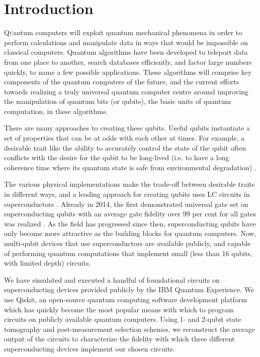 \section{Introduction}

\lettrine[nindent=0em,lines=3]{Q} uantum computers will exploit quantum mechanical
phenomena in order to perform calculations and manipulate data in ways that
would be impossible on classical computers. Quantum algorithms have been
developed to teleport data from one place to another, search databases
efficiently, and factor large numbers quickly, to name a few possible
applications. These algorithms will comprise key components of the quantum
computers of the future, and the current efforts towards realizing a truly
universal quantum computer centre around improving the manipulation of quantum
bits (or qubits), the basic units of quantum computation, in these algorithms.

There are many approaches to creating these qubits. Useful qubits instantiate a
set of properties that can be at odds with each other at times. For example, a
desirable trait like the ability to accurately control the state of the qubit
often conflicts with the desire for the qubit to be long-lived (i.e. to have a
long coherence time where its quantum state is safe from environmental
degradation) \cite{nielsen10_quant}.

The various physical implementations make the trade-off between desirable traits
in different ways, and a leading approach for creating qubits uses LC circuits
in superconductors \cite{kjaergaard19_super_qubit}. Already in 2014, the first
demonstrated universal gate set on superconducting qubits with an average gate
fidelity over 99 per cent for all gates was realized
\cite{barends14_super_quant_circuit_at_surfac}. As the field has progressed
since then, superconducting qubits have only become more attractive as the
building blocks for quantum computers. Now, multi-qubit devices that use
superconductors are available publicly, and capable of performing quantum
computations that implement small (less than 16 qubits, with limited depth)
circuits.

We have simulated and executed a handful of foundational circuits on
superconducting devices provided publicly by the IBM Quantum Experience. We use
Qiskit, an open-source quantum computing software development platform which has
quickly become the most popular means with which to program circuits on publicly
available quantum computers. Using 1- and 2-qubit state tomography and
post-measurement selection schemes, we reconstruct the average output of the
circuits to characterize the fidelity with which three different superconducting
devices implement our chosen circuits.

